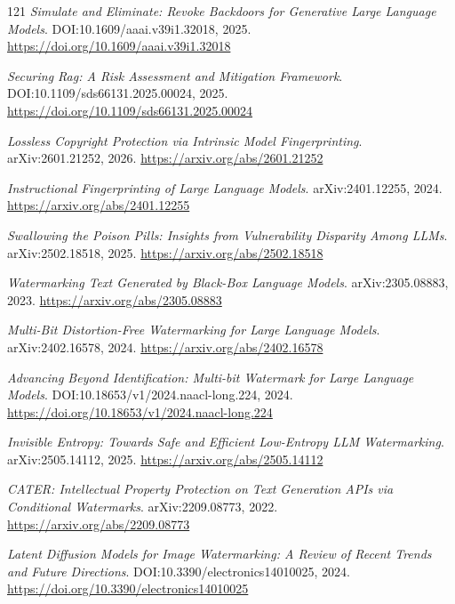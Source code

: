 \documentclass[11pt,a4paper]{article}
\begin{document}
\begin{thebibliography}{121}
\newblock \emph{Simulate and Eliminate: Revoke Backdoors for Generative Large Language Models}.
\newblock DOI:10.1609/aaai.v39i1.32018, 2025.
\newblock \url{https://doi.org/10.1609/aaai.v39i1.32018}

\newblock \emph{Securing Rag: A Risk Assessment and Mitigation Framework}.
\newblock DOI:10.1109/sds66131.2025.00024, 2025.
\newblock \url{https://doi.org/10.1109/sds66131.2025.00024}

\newblock \emph{Lossless Copyright Protection via Intrinsic Model Fingerprinting}.
\newblock arXiv:2601.21252, 2026.
\newblock \url{https://arxiv.org/abs/2601.21252}

\newblock \emph{Instructional Fingerprinting of Large Language Models}.
\newblock arXiv:2401.12255, 2024.
\newblock \url{https://arxiv.org/abs/2401.12255}

\newblock \emph{Swallowing the Poison Pills: Insights from Vulnerability Disparity Among LLMs}.
\newblock arXiv:2502.18518, 2025.
\newblock \url{https://arxiv.org/abs/2502.18518}

\newblock \emph{Watermarking Text Generated by Black-Box Language Models}.
\newblock arXiv:2305.08883, 2023.
\newblock \url{https://arxiv.org/abs/2305.08883}

\newblock \emph{Multi-Bit Distortion-Free Watermarking for Large Language Models}.
\newblock arXiv:2402.16578, 2024.
\newblock \url{https://arxiv.org/abs/2402.16578}

\newblock \emph{Advancing Beyond Identification: Multi-bit Watermark for Large Language Models}.
\newblock DOI:10.18653/v1/2024.naacl-long.224, 2024.
\newblock \url{https://doi.org/10.18653/v1/2024.naacl-long.224}

\newblock \emph{Invisible Entropy: Towards Safe and Efficient Low-Entropy LLM Watermarking}.
\newblock arXiv:2505.14112, 2025.
\newblock \url{https://arxiv.org/abs/2505.14112}

\newblock \emph{CATER: Intellectual Property Protection on Text Generation APIs via Conditional Watermarks}.
\newblock arXiv:2209.08773, 2022.
\newblock \url{https://arxiv.org/abs/2209.08773}

\newblock \emph{Latent Diffusion Models for Image Watermarking: A Review of Recent Trends and Future Directions}.
\newblock DOI:10.3390/electronics14010025, 2024.
\newblock \url{https://doi.org/10.3390/electronics14010025}


\end{thebibliography}
\end{document}
